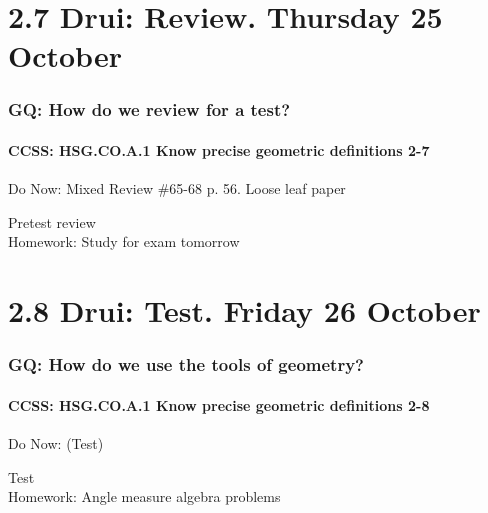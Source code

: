 \documentclass{beamer}
\begin{document}
\section{2.7 Drui: Review. Thursday 25 October}
  \frame
  {
  \frametitle{GQ: How do we review for a test?}
  \framesubtitle{CCSS: HSG.CO.A.1 Know precise geometric definitions  \alert{2-7}}

  \begin{block}{Do Now: Mixed Review \#65-68 p. 56. Loose leaf paper}
  \end{block}
  Pretest review\\
  \vspace{0.5cm}
  Homework: Study for \alert{exam tomorrow}
}

\section{2.8 Drui: Test. Friday 26 October}
        \frame
        {
          \frametitle{GQ: How do we use the tools of geometry?}
          \framesubtitle{CCSS: HSG.CO.A.1 Know precise geometric definitions  \alert{2-8}}

          \begin{block}{Do Now: (Test)}
          \end{block}
          Test\\
          \vspace{1cm}
          Homework: Angle measure algebra problems
        }
\end{document}
